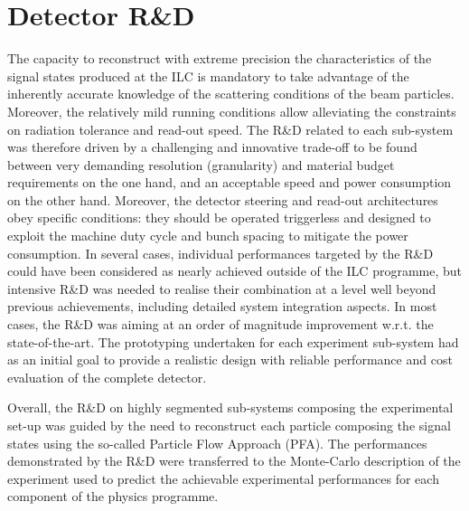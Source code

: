 \documentclass[%
 reprint,
 amsmath,amssymb,
 aps,
]{revtex4-1}
\newcommand{\todo}[1]{\textcolor{red}{{#1}}}
\begin{document}



\section{\label{sec:detectrd} Detector R\&D}




The capacity to reconstruct with extreme precision the characteristics of the signal states produced at the ILC is mandatory to take advantage of the inherently accurate knowledge of the scattering conditions of the beam particles. Moreover, the relatively mild running conditions allow alleviating the constraints on radiation tolerance and read-out speed. The R\&D related to each sub-system was therefore driven by a challenging and innovative trade-off to be found between very demanding resolution (granularity) and material budget requirements on the one hand, and an acceptable speed and power consumption on the other hand. Moreover, the detector steering and read-out architectures obey specific conditions: they should be operated triggerless and designed to exploit the machine duty cycle and bunch spacing to mitigate the power consumption.
In several cases, individual performances targeted by the R\&D could have been considered as nearly achieved outside of the ILC programme, but intensive R\&D was needed to realise their combination at a level well beyond previous achievements, including detailed system integration aspects. In most cases, the R\&D was aiming at an order of magnitude improvement w.r.t. the state-of-the-art. The prototyping undertaken for each experiment sub-system had as an initial goal to provide a realistic design with reliable performance and cost evaluation of the complete detector.

Overall, the R\&D on highly segmented sub-systems composing the experimental set-up was guided by the need to reconstruct each particle composing the signal states using the so-called Particle Flow Approach (PFA). The performances demonstrated by the R\&D were transferred to the Monte-Carlo description of the experiment used to predict the achievable experimental performances for each component of the physics programme.
\end{document}
